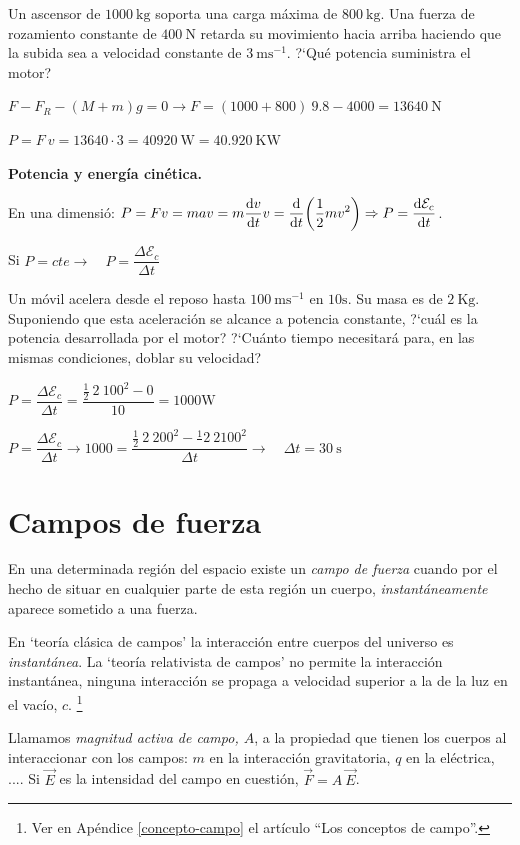 \begin{ejem}
Un ascensor de $1000\ \mathrm{kg}$ soporta una carga máxima de $800 \ \mathrm{kg}$. Una fuerza de rozamiento constante de $400 \ \mathrm{N}$ retarda su movimiento hacia arriba haciendo que la subida sea a velocidad constante de $3 \ \mathrm{ms}^{-1}$. ?`Qué potencia suministra el motor?	
\end{ejem}
$F-F_R-(M+m)g=0 \to F=(1000+800)\ 9.8-4000=13640\ \mathrm{N}$

$P=F\ v=13640 \cdot 3 = 40920 \ \mathrm{W}= 40.920 \ \mathrm{KW}$

\textbf{Potencia y energía cinética.}

En una dimensió: $\displaystyle P=Fv=mav = m \dv{v}{t} v =\dv{t}(\dfrac 1 2 mv^2)\Rightarrow P=\dv{\mathcal E_c}{t}$.

Si $P=cte \to \quad P=\dfrac{\Delta \mathcal E_c}{\Delta t} $

\begin{ejem}
\normalsize{Un} móvil acelera desde el reposo hasta $100	\ \mathrm{ms}^{-1}$ en $10 \mathrm{s}$. Su masa es de $2\ \mathrm{Kg}$. Suponiendo que esta aceleración se alcance a potencia constante, ?`cuál es la potencia desarrollada por el motor? ?`Cuánto tiempo necesitará para, en las mismas condiciones, doblar su velocidad?
\end{ejem}

$P=\dfrac{\Delta \mathcal E_c}{\Delta t}=\dfrac{\frac 1 2 \ 2 \ 100^2 - 0}{10}=1000 \mathrm{W}$

$P=\dfrac{\Delta \mathcal E_c}{\Delta t} \to 1000=\dfrac{\frac 1 2 \ 2 \ 200^2 - \frac 1 \ 2 \ 2 100^2}{\Delta t} \to \quad \Delta t=30\ \mathrm{s}$


\section{Campos de fuerza}

En una determinada región del espacio existe un \emph{campo de fuerza} cuando por el hecho de situar en cualquier parte de esta región un cuerpo, \emph{instantáneamente} aparece sometido a una fuerza.

En `teoría clásica de campos' la interacción entre cuerpos del universo es \emph{instantánea}. La `teoría relativista de campos'  no permite la interacción instantánea, ninguna interacción se propaga a velocidad superior a la de la luz en el vacío, $c$. \footnote{Ver en Apéndice \ref{concepto-campo} el artículo ``Los conceptos de campo''.}

Llamamos \emph{magnitud activa de campo, $A$}, a la propiedad que tienen los cuerpos al interaccionar con los campos: $m$ en la interacción gravitatoria, $q$ en la eléctrica, .... Si $\vec E$ es la intensidad del campo en cuestión, $\vec F=A\ \vec E$.

